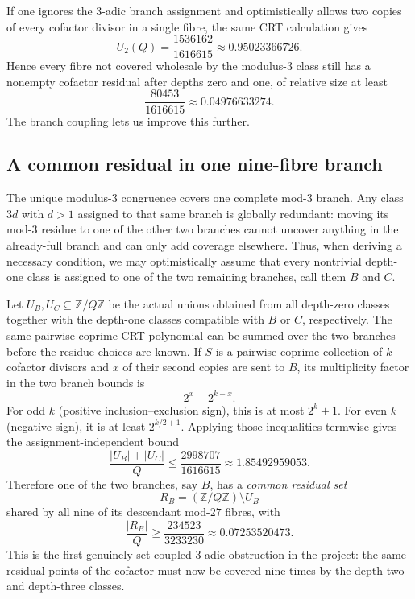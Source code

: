 \documentclass[11pt]{article}
\theoremstyle{definition}
\newcommand{\Z}{\mathbb Z}
\begin{document}
If one ignores the 3-adic branch assignment and optimistically allows two copies of every
cofactor divisor in a single fibre, the same CRT calculation gives
\[
 U_2(Q)=\frac{1536162}{1616615}\approx0.95023366726.
\]
Hence every fibre not covered wholesale by the modulus-$3$ class still has a nonempty
cofactor residual after depths zero and one, of relative size at least
\[
 \frac{80453}{1616615}\approx0.04976633274.
\]
The branch coupling lets us improve this further.

\subsection{A common residual in one nine-fibre branch}

The unique modulus-$3$ congruence covers one complete mod-$3$ branch.  Any class $3d$ with
$d>1$ assigned to that same branch is globally redundant: moving its mod-$3$ residue to one
of the other two branches cannot uncover anything in the already-full branch and can only add
coverage elsewhere.  Thus, when deriving a necessary condition, we may optimistically assume
that every nontrivial depth-one class is assigned to one of the two remaining branches, call
them $B$ and $C$.

Let $U_B,U_C\subseteq\Z/Q\Z$ be the actual unions obtained from all depth-zero classes together
with the depth-one classes compatible with $B$ or $C$, respectively.  The same pairwise-coprime
CRT polynomial can be summed over the two branches before the residue choices are known.  If
$S$ is a pairwise-coprime collection of $k$ cofactor divisors and $x$ of their second copies are
sent to $B$, its multiplicity factor in the two branch bounds is
\[
 2^x+2^{k-x}.
\]
For odd $k$ (positive inclusion--exclusion sign), this is at most $2^k+1$.  For even $k$
(negative sign), it is at least $2^{k/2+1}$.  Applying those inequalities termwise gives the
assignment-independent bound
\[
 \frac{|U_B|+|U_C|}{Q}
 \le
 \frac{2998707}{1616615}
 \approx1.85492959053.
\]
Therefore one of the two branches, say $B$, has a \emph{common residual set}
\[
 R_B=(\Z/Q\Z)\setminus U_B
\]
shared by all nine of its descendant mod-$27$ fibres, with
\begin{equation}\label{eq:branch-residual}
 \boxed{
 \frac{|R_B|}{Q}\ge
 \frac{234523}{3233230}
 \approx0.07253520473.}
\end{equation}
This is the first genuinely set-coupled $3$-adic obstruction in the project: the same residual
points of the cofactor must now be covered nine times by the depth-two and depth-three classes.
\end{document}
